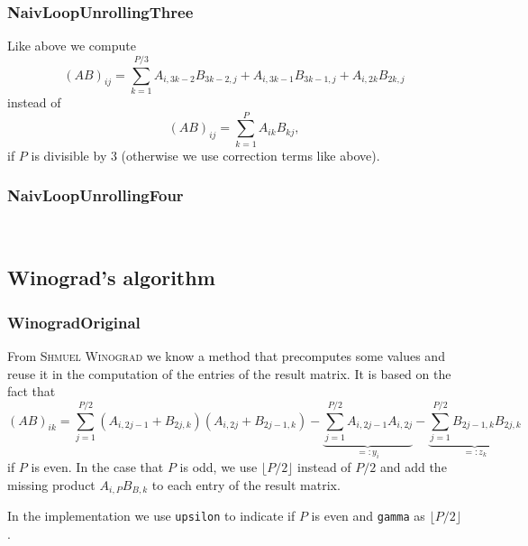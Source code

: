 \documentclass{amsart}
\newcommand{\CODE}[2]{}
\begin{document}
\CODE{NaivLoopUnrollingTwo.c}{3}

\subsubsection{NaivLoopUnrollingThree} Like above we compute
\[
(AB)_{ij} =\sum_{k=1}^{P/3} A_{i,3k-2}B_{3k-2,j} +  A_{i,3k-1}B_{3k-1,j} + A_{i,2k}B_{2k,j}
\]
instead of
\[
(AB)_{ij}=\sum_{k=1}^P A_{ik}B_{kj},
\]
if $P$ is divisible by $3$ (otherwise we use correction terms like above).

\CODE{NaivLoopUnrollingThree.c}{3}

\subsubsection{NaivLoopUnrollingFour}~

\CODE{NaivLoopUnrollingFour.c}{3}

















\subsection{Winograd's algorithm}
\subsubsection{WinogradOriginal} From \textsc{Shmuel Winograd} we know a method that precomputes some values and reuse it in the computation of the entries of the result matrix. It is based on the fact that
\[
(AB)_{ik}=\sum_{j=1}^{P/2} (A_{i,2j-1} + B_{2j,k})(A_{i,2j} + B_{2j-1,k}) - \underbrace{\sum_{j=1}^{P/2}A_{i,2j-1}A_{i,2j}}_{=:y_i} -
\underbrace{\sum_{j=1}^{P/2}B_{2j-1,k}B_{2j,k}}_{=:z_k}
\]
if $P$ is even. In the case that $P$ is odd, we use $\lfloor P/2\rfloor$ instead of $P/2$ and add the missing product $A_{i,P}B_{B,k}$ to each entry of the result matrix.

In the implementation we use \texttt{upsilon} to indicate if $P$ is even and \texttt{gamma} as $\lfloor P/2 \rfloor$.
\CODE{WinogradOriginal.c}{3}
\end{document}
